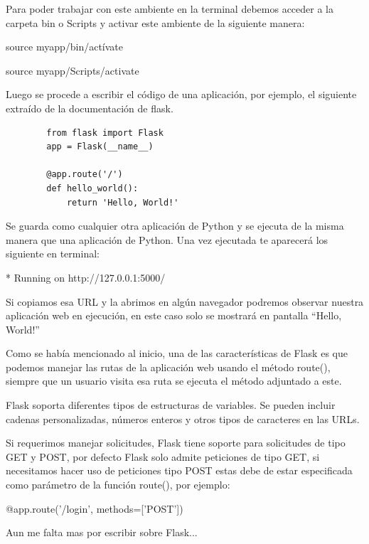 \documentclass[12pt, a4paper, titlepage]{report}
\begin{document}
		Para poder trabajar con este ambiente en la terminal debemos acceder a la carpeta bin o Scripts y activar este ambiente de la siguiente manera:\par
		\begin{center}
		source myapp/bin/actívate\par
		source myapp/Scripts/activate
		\end{center}
		Luego se procede a escribir el código de una aplicación, por ejemplo, el siguiente extraído de la documentación de flask.\cite{refFlask1}
		\begin{verbatim}
		from flask import Flask  
		app = Flask(__name__) 

		@app.route('/')  
		def hello_world():  
		    return 'Hello, World!'  
		\end{verbatim}
		Se guarda como cualquier otra aplicación de Python y se ejecuta de la misma manera que una aplicación de Python. Una vez ejecutada te aparecerá los siguiente en terminal:\par
		\begin{center}
		* Running on http://127.0.0.1:5000/
		\end{center}
		Si copiamos esa URL y la abrimos en algún navegador podremos observar nuestra aplicación web en ejecución, en este caso solo se mostrará en pantalla “Hello, World!”\par
		Como se había mencionado al inicio, una de las características de Flask es que podemos manejar las rutas de la aplicación web usando el método route(), siempre que un usuario visita esa ruta se ejecuta el método adjuntado a este.\par
		Flask soporta diferentes tipos de estructuras de variables. Se pueden incluir cadenas personalizadas, números enteros y otros tipos de caracteres en las URLs.\par
		Si requerimos manejar solicitudes, Flask tiene soporte para solicitudes de tipo GET y POST, por defecto Flask solo admite peticiones de tipo GET, si necesitamos hacer uso de peticiones tipo POST estas debe de estar especificada como parámetro de la función route(), por ejemplo:\par
		\begin{center}
		@app.route('/login', methods=['POST'])
		\end{center}
		Aun me falta mas por escribir sobre Flask...
		
\end{document}

